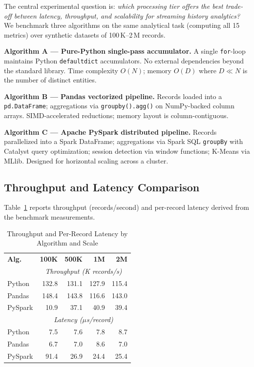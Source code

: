 \documentclass[conference]{IEEEtran}
\begin{document}
The central experimental question is: \emph{which processing tier offers
the best trade-off between latency, throughput, and scalability for
streaming history analytics?} We benchmark three algorithms on the same
analytical task (computing all 15 metrics) over synthetic datasets of
100\,K–2\,M records.

\textbf{Algorithm A — Pure-Python single-pass accumulator.}
A single \texttt{for}-loop maintains Python \texttt{defaultdict}
accumulators. No external dependencies beyond the standard library.
Time complexity $O(N)$; memory $O(D)$ where $D \ll N$ is the number of
distinct entities.

\textbf{Algorithm B — Pandas vectorized pipeline.}
Records loaded into a \texttt{pd.DataFrame}; aggregations via
\texttt{groupby().agg()} on NumPy-backed column arrays. SIMD-accelerated
reductions; memory layout is column-contiguous.

\textbf{Algorithm C — Apache PySpark distributed pipeline.}
Records parallelized into a Spark DataFrame; aggregations via Spark SQL
\texttt{groupBy} with Catalyst query optimization; session detection via
window functions; K-Means via MLlib. Designed for horizontal scaling
across a cluster.

\subsection{Throughput and Latency Comparison}

Table~\ref{tab:perf} reports throughput (records/second) and per-record
latency derived from the benchmark measurements.

\begin{table}[!t]
\caption{Throughput and Per-Record Latency by Algorithm and Scale}
\label{tab:perf}
\centering
\scriptsize
\setlength{\tabcolsep}{3pt}
\renewcommand{\arraystretch}{1.1}
\begin{tabular}{lrrrr}
\toprule
\textbf{Alg.} & \textbf{100K} & \textbf{500K} & \textbf{1M} & \textbf{2M} \\
              & \multicolumn{4}{c}{\textit{Throughput (K records/s)}} \\
\midrule
Python  & 132.8 & 131.1 & 127.9 & 115.4 \\
Pandas  & 148.4 & 143.8 & 116.6 & 143.0 \\
PySpark & 10.9  & 37.1  & 40.9  & 39.4  \\
\midrule
              & \multicolumn{4}{c}{\textit{Latency ($\mu$s/record)}} \\
\midrule
Python  & 7.5   & 7.6   & 7.8   & 8.7   \\
Pandas  & 6.7   & 7.0   & 8.6   & 7.0   \\
PySpark & 91.4  & 26.9  & 24.4  & 25.4  \\
\bottomrule
\end{tabular}
\end{table}
\end{document}
